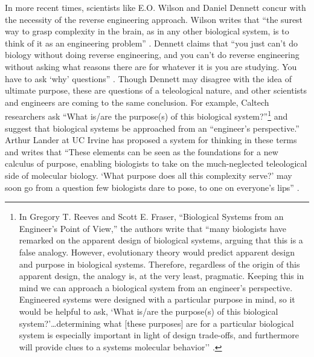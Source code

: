 In more recent times, scientists like E.O. Wilson and Daniel Dennett
concur with the necessity of the reverse engineering approach. Wilson
writes that “the surest way to grasp complexity in the brain, as in any
other biological system, is to think of it as an engineering
problem” \citep[][p.~112]{wilson1998}. Dennett claims that ``you just can’t do
biology without doing reverse engineering, and you can’t do reverse
engineering without asking what reasons there are for whatever it is
you are studying. You have to ask `why' questions'' \citep[][p.~213]{dennett1996}.
Though Dennett may disagree with the idea of ultimate purpose, these
are questions of a teleological nature, and other scientists and
engineers are coming to the same conclusion. For example, Caltech
researchers ask “What is/are the purpose(s) of this biological
system?”\footnote{
In Gregory T. Reeves and Scott E. Fraser,
“Biological Systems from an Engineer’s Point of View,” 
the authors write that ``many biologists have remarked on the apparent
design of biological systems, arguing that this is a false analogy.
However, evolutionary theory would predict apparent design and purpose
in biological systems. Therefore, regardless of the origin of this
apparent design, the analogy is, at the very least, pragmatic. Keeping
this in mind we can approach a biological system from an engineer’s
perspective. Engineered systems were designed with a particular purpose
in mind, so it would be helpful to ask, `What is/are the purpose(s) of
this biological system?'{\ldots}determining what [these purposes] are for a
particular biological system is especially important in light of design
trade-offs, and furthermore will provide clues to a systems molecular
behavior'’ \citep{reevesfraser2009}.
} and suggest that biological systems be
approached from an “engineer’s perspective.” Arthur Lander at UC Irvine
has proposed a system for thinking in these terms and writes that
``These elements can be seen as the foundations for a new calculus of
purpose, enabling biologists to take on the much-neglected teleological
side of molecular biology. `What purpose does all this complexity
serve?' may soon go from a question few biologists dare to pose, to one
on everyone’s lips'' \citep{lander2004}.

